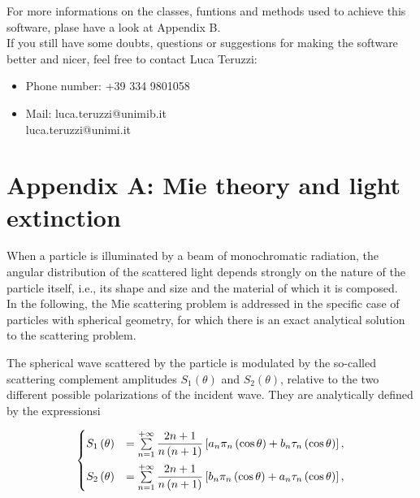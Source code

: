 \documentclass[a4paper, 11pt]{report}
\begin{document}
\newpage
For more informations on the classes, funtions and methods used to achieve this software, plase have a look at Appendix B. \\
If you still have some doubts, questions or suggestions for making the software better and nicer, feel free to contact Luca Teruzzi: \\
\begin{itemize}
\item Phone number: +39 334 9801058
\item Mail: luca.teruzzi@unimib.it \\
                \hspace*{0.95 cm} luca.teruzzi@unimi.it
\end{itemize}




\newpage
\chapter{Appendix A: Mie theory and light extinction}

When a particle is illuminated by a beam of monochromatic radiation, the angular distribution of the scattered light depends strongly on the nature of the particle itself, i.e., its shape and size and the material of which it is composed. \\
In the following, the Mie scattering problem is addressed in the specific case of particles with spherical geometry, for which there is an exact analytical solution to the scattering problem.

The spherical wave scattered by the particle is modulated by the so-called scattering complement amplitudes $S_1(\theta)$ and $S_2(\theta)$, relative to the two different possible polarizations of the incident wave. They are analytically defined by the expressionsi \cite{BH, scattering_sphere_1}

\begin{equation}
	\vspace*{0.1 cm}
	\begin{cases}
	S_{1} \left( \theta \right) &= \sum\limits_{n=1}^{+\infty} \dfrac{2n+1}{n\left( n+1 \right)} \left[ a_{n}\pi_{n}\left( \cos\theta \right) + b_{n}\tau_{n}\left( \cos\theta \right) \right] , \\[10 pt]
	S_{2} \left( \theta \right) &= \sum\limits_{n=1}^{+\infty} \dfrac{2n+1}{n\left( n+1 \right)} \left[ b_{n}\pi_{n}\left( \cos\theta \right) + a_{n}\tau_{n}\left( \cos\theta \right) \right] , 
	\end{cases}
	\vspace*{0.2 cm}
	\label{S12_sphere}
\end{equation}
\end{document}
